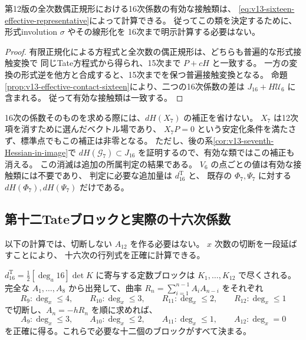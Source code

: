\begin{corollary}
\label{cor:v13-even-normalization-comparison}
第12版の全次数偶正規形における16次係数の有効な接触類は、
\eqref{eq:v13-sixteen-effective-representative}によって計算できる。
従ってこの類を決定するために、形式involution $\sigma$ やその線形化を
16次まで明示計算する必要はない。
\end{corollary}
\begin{proof}
有限正規化による方程式と全次数の偶正規形は、どちらも普遍的な形式接触変換で
同じTate方程式から得られ、15次まで $P+cH$ と一致する。
一方の変換の形式逆を他方と合成すると、15次までを保つ普遍接触変換となる。
命題\ref{prop:v13-effective-contact-sixteen}により、二つの16次係数の差は
$J_{16}+H\mathcal U_6$ に含まれる。
従って有効な接触類は一致する。
\end{proof}

16次の係数そのものを求める際には、$dH(X_7)$ の補正を省けない。
$X_7$ は12次項を消すために選んだベクトル場であり、
$X_7P=0$ という安定化条件を満たさず、標準点でもこの補正は非零となる。
ただし、後の系\ref{cor:v13-seventh-Hessian-in-image}で
$dH(\mathcal G_7)\subset J_{16}$ を証明するので、有効な類ではこの補正も消える。
この消滅は追加の所属判定の結果である。
$V_6$ の点ごとの値は有効な接触類には不要であり、
判定に必要な追加量は $d^{\mathrm T}_{16}$ と、
既存の $\Phi_7,\Psi_7$ に対する $dH(\Phi_7),dH(\Psi_7)$ だけである。

\subsection{第十二Tateブロックと実際の十六次係数}
\label{subsec:v13-actual-sixteenth}

以下の計算では、切断しない $A_{12}$ を作る必要はない。
$x$ 次数の切断を一段延ばすことにより、
十六次の行列式を正確に計算できる。

\begin{lemma}[十六次係数のための正確な切断]
\label{lem:v13-exact-twelfth-truncation}
$d^{\mathrm T}_{16}=\tfrac12[\deg_a16]\det K$ に寄与する定数ブロックは
$K_1,\ldots,K_{12}$ で尽くされる。
完全な $A_1,\ldots,A_8$ から出発して、曲率
$R_n=\sum_{i=1}^{n-1}A_iA_{n-i}$ をそれぞれ
\[
 R_9:\deg_x\le4,\qquad
 R_{10}:\deg_x\le3,\qquad
 R_{11}:\deg_x\le2,\qquad
 R_{12}:\deg_x\le1
\]
で切断し、$A_n=-hR_n$ を順に求めれば、
\[
 A_9:\deg_x\le3,\qquad
 A_{10}:\deg_x\le2,\qquad
 A_{11}:\deg_x\le1,\qquad
 A_{12}:\deg_x=0
\]
を正確に得る。これらで必要な十二個のブロックがすべて決まる。
\end{lemma}

